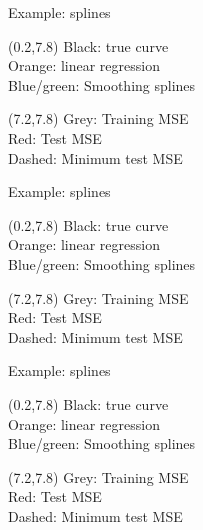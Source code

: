 \documentclass[14pt]{beamer}
\begin{document}
\begin{frame}{Example: splines}
\begin{textblock}{6}(0.2,7.8)\small
Black: true curve\\
Orange: linear regression\\
Blue/green: Smoothing splines
\end{textblock}
\begin{textblock}{6.5}(7.2,7.8)\small
Grey: Training MSE\\
Red: Test MSE\\
Dashed: Minimum test MSE
\end{textblock}
\end{frame}

\begin{frame}{Example: splines}
\begin{textblock}{6}(0.2,7.8)\small
Black: true curve\\
Orange: linear regression\\
Blue/green: Smoothing splines
\end{textblock}
\begin{textblock}{6.5}(7.2,7.8)\small
Grey: Training MSE\\
Red: Test MSE\\
Dashed: Minimum test MSE
\end{textblock}
\end{frame}


\begin{frame}{Example: splines}
\begin{textblock}{6}(0.2,7.8)\small
Black: true curve\\
Orange: linear regression\\
Blue/green: Smoothing splines
\end{textblock}
\begin{textblock}{6.5}(7.2,7.8)\small
Grey: Training MSE\\
Red: Test MSE\\
Dashed: Minimum test MSE
\end{textblock}
\end{frame}
\end{document}
